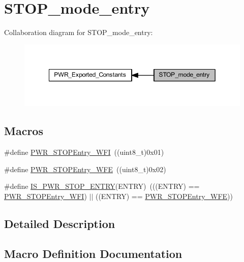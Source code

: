 \hypertarget{group___s_t_o_p__mode__entry}{}\section{S\+T\+O\+P\+\_\+mode\+\_\+entry}
\label{group___s_t_o_p__mode__entry}
Collaboration diagram for S\+T\+O\+P\+\_\+mode\+\_\+entry\+:
\nopagebreak
\begin{figure}[H]
\begin{center}
\leavevmode
\includegraphics[width=349pt]{group___s_t_o_p__mode__entry}
\end{center}
\end{figure}
\subsection*{Macros}
\begin{DoxyCompactItemize}
\item 
\#define \hyperlink{group___s_t_o_p__mode__entry_gaa1e1362f3d0b93e8f5f674e18cfc96c4}{P\+W\+R\+\_\+\+S\+T\+O\+P\+Entry\+\_\+\+W\+FI}~((uint8\+\_\+t)0x01)
\item 
\#define \hyperlink{group___s_t_o_p__mode__entry_gaac98ac55fb8764121d4168d99c9b369e}{P\+W\+R\+\_\+\+S\+T\+O\+P\+Entry\+\_\+\+W\+FE}~((uint8\+\_\+t)0x02)
\item 
\#define \hyperlink{group___s_t_o_p__mode__entry_ga4a94eb1f400dec6e486fbc229cbea8a0}{I\+S\+\_\+\+P\+W\+R\+\_\+\+S\+T\+O\+P\+\_\+\+E\+N\+T\+RY}(E\+N\+T\+RY)~(((E\+N\+T\+RY) == \hyperlink{group___s_t_o_p__mode__entry_gaa1e1362f3d0b93e8f5f674e18cfc96c4}{P\+W\+R\+\_\+\+S\+T\+O\+P\+Entry\+\_\+\+W\+FI}) $\vert$$\vert$ ((E\+N\+T\+RY) == \hyperlink{group___s_t_o_p__mode__entry_gaac98ac55fb8764121d4168d99c9b369e}{P\+W\+R\+\_\+\+S\+T\+O\+P\+Entry\+\_\+\+W\+FE}))
\end{DoxyCompactItemize}


\subsection{Detailed Description}


\subsection{Macro Definition Documentation}
\mbox{\label{group___s_t_o_p__mode__entry_ga4a94eb1f400dec6e486fbc229cbea8a0}} 
